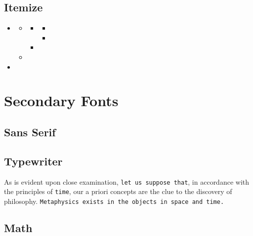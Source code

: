 \documentclass[kant]{rhelder3}
\begin{document}
\subsection{Itemize}

\autokant
\autokant*
\begin{itemize}
  \RaggedRight
  \item \autokant*[1][1]
    \begin{itemize}
      \item \autokant*[0][1]
        \begin{itemize}
          \item \autokant*[0][1]
            \begin{itemize}
              \item \autokant*[0][1]
              \item \autokant*[1][1]
            \end{itemize}
          \item \autokant*[0][1]
        \end{itemize}
      \item \autokant*[0][1]
    \end{itemize}
  \item \autokant*[0][1]
\end{itemize}
\autokant


\section{Secondary Fonts}

\subsection{Sans Serif}

\autokant*[1][1]
\textsf{\autokant*[0][1]}
\autokant*[0][1]

\textsf{\autokant[1][3]}

\autokant[1][2]

\subsection{Typewriter}

As is evident upon close examination,
\texttt{let us suppose that},
in accordance with the principles of \texttt{time},
our a priori concepts are the clue to the discovery of philosophy.
\texttt{Metaphysics exists in the objects in space and time.}
\autokant*[1][1]

\subsection{Math}
\end{document}
